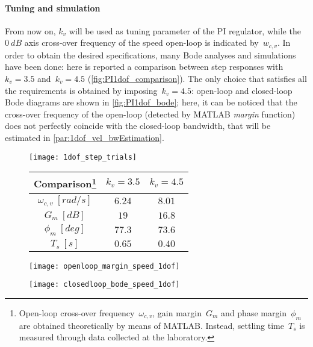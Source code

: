\paragraph{Tuning and simulation}
From now on, $k_v$ will be used as tuning parameter of the PI regulator, while the~$0\ dB$ axis cross-over frequency of the speed open-loop is indicated by~$w_{c,v}$. In order to obtain the desired specifications, many Bode analyses and simulations have been done: here is reported a comparison between step responses with~$k_v=3.5$ and~$k_v=4.5$ (\cref{fig:PI1dof_comparison}).
The only choice that satisfies all the requirements is obtained by imposing~$k_v = 4.5$: open-loop and closed-loop Bode diagrams are shown in \cref{fig:PI1dof_bode}; here, it can be noticed that the cross-over frequency of the open-loop (detected by MATLAB \textit{margin} function) does not perfectly coincide with the closed-loop bandwidth, that will be estimated in \cref{par:1dof_vel_bwEstimation}.
\begin{figure*}[h]
	\centering
	\begin{subfigure}{0.45\columnwidth}
		\texttt{[image: 1dof\_step\_trials]}
		\label{fig:PI1dof_step}
	\end{subfigure}
	\begin{subfigure}{0.45\columnwidth}
		\centering
		\begin{tabular}{|c|cc|}
			\hline
			Comparison\footnote{Open-loop cross-over frequency~$\omega_{c,v}$, gain margin~$G_m$ and phase margin~$\phi_m$ are obtained theoretically by means of MATLAB. Instead, settling time~$T_s$ is measured through data collected at the laboratory.} & $k_v=3.5$ & $k_v=4.5$ \\
			\hline
			$\omega_{c,v}\ [rad/s]$ & $6.24$ & $8.01$ \\
			$G_m\ [dB]$ & $19$ & $16.8$ \\
			$\phi_m\ [deg]$ & $77.3$ & $73.6$ \\
			\hline
			$T_s\ [s]$ & $0.65$ & $0.40$ \\
			\hline
		\end{tabular}
	\end{subfigure}
	\caption{Comparisons between $k_v = 3.5$ and $k_v = 4.5$ cases}
	\label{fig:PI1dof_comparison}
	\begin{subfigure}{0.45\columnwidth}
		\texttt{[image: openloop\_margin\_speed\_1dof]}
		\label{fig:PI1dof_bode_openLoop}
	\end{subfigure}
	\begin{subfigure}{0.45\columnwidth}
		\texttt{[image: closedloop\_bode\_speed\_1dof]}
		\label{fig:PI1dof_bode_closedLoop}
	\end{subfigure}
	\caption{Bode diagrams with $k_v = 4.5$}
	\label{fig:PI1dof_bode}
\end{figure*}

